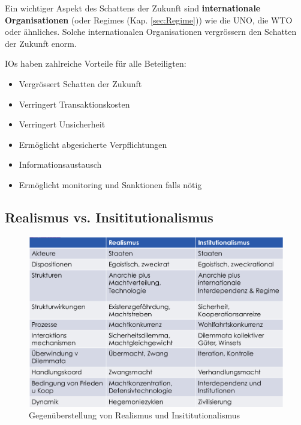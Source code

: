 \documentclass[a4paper, 11pt]{article}
\begin{document}
\vspace{10px}

\noindent Ein wichtiger Aspekt des Schattens der Zukunft sind \textbf{internationale Organisationen} (oder Regimes (Kap. \ref{sec:Regime}))  wie die UNO, die WTO oder ähnliches. Solche internationalen Organisationen vergrössern den Schatten der Zukunft enorm.

\vspace{10px}

\noindent IOs haben zahlreiche Vorteile für alle Beteiligten:

\begin{itemize}
    \item Vergrössert Schatten der Zukunft
    \item Verringert Transaktionskosten
    \item Verringert Unsicherheit
    \item Ermöglicht abgesicherte Verpflichtungen
    \item Informationsaustausch
    \item Ermöglicht monitoring und Sanktionen falls nötig
\end{itemize}
\newpage
\subsection{Realismus vs. Insititutionalismus}

\begin{figure}[htb]
    \centering
    \includegraphics[keepaspectratio=true,height=20\baselineskip]{realismusvsinstitutionalismus.png}
    \caption{Gegenüberstellung von Realismus und Insititutionalismus}
    \label{fig:realismusvsinstitutionalismus}
\end{figure}
\end{document}
